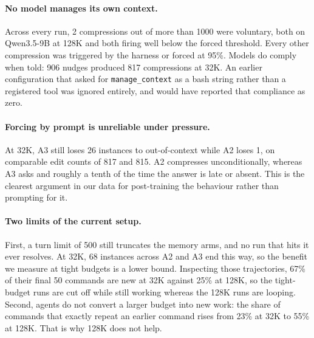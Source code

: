 \paragraph{No model manages its own context.}
Across every run, 2 compressions out of more than 1000 were voluntary, both on
Qwen3.5-9B at 128K and both firing well below the forced threshold. Every other
compression was triggered by the harness or forced at 95\%. Models do comply when
told: 906 nudges produced 817 compressions at 32K. An earlier configuration that
asked for \texttt{manage\_context} as a bash string rather than a registered tool
was ignored entirely, and would have reported that compliance as zero.

\paragraph{Forcing by prompt is unreliable under pressure.}
At 32K, A3 still loses 26 instances to out-of-context while A2 loses 1, on
comparable edit counts of 817 and 815. A2 compresses unconditionally, whereas A3
asks and roughly a tenth of the time the answer is late or absent. This is the
clearest argument in our data for post-training the behaviour rather than
prompting for it.

\paragraph{Two limits of the current setup.}
First, a turn limit of 500 still truncates the memory arms, and no run that hits
it ever resolves. At 32K, 68 instances across A2 and A3 end this way, so the
benefit we measure at tight budgets is a lower bound. Inspecting those
trajectories, 67\% of their final 50 commands are new at 32K against 25\% at
128K, so the tight-budget runs are cut off while still working whereas the 128K
runs are looping. Second, agents do not convert a larger budget into new work:
the share of commands that exactly repeat an earlier command rises from 23\% at
32K to 55\% at 128K. That is why 128K does not help.
